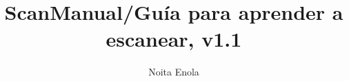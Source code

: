 
\usepackage[T1]{fontenc}
\usepackage[utf8]{inputenc}

\usepackage{fontawesome5} %
\usepackage[scaled=0.85]{beramono} %
\usepackage{arev} %
\usepackage{charter} %

\usepackage[spanish]{babel}

\usepackage[final]{microtype}

\newcommand{\documentTitle}{ScanManual/Guía para aprender a escanear}
\newcommand{\documentVersion}{v1.1}
\newcommand{\documentAuthor}{Noita Enola}
\newcommand{\documentURL}{https://github.com/Noitaenola/ScanManual}

\title{\documentTitle, \documentVersion}
\author{\documentAuthor}

\setbinding{3mm}
\isopage[12]
\checkandfixthelayout

\pagestyle{ruled}
\setsecheadstyle{\Large\bfseries\sffamily}
\setsubsecheadstyle{\large\bfseries\sffamily}
\setsubsubsecheadstyle{\bfseries\sffamily}
\setparaheadstyle{\bfseries\sffamily}
\setlength{\headheight}{13pt}

